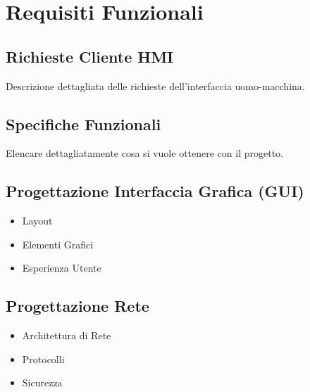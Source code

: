 \documentclass[a4paper,12pt]{article}
\begin{document}
\section{Requisiti Funzionali}
\subsection{Richieste Cliente HMI}
Descrizione dettagliata delle richieste dell'interfaccia uomo-macchina.

\subsection{Specifiche Funzionali}
Elencare dettagliatamente cosa si vuole ottenere con il progetto.

\subsection{Progettazione Interfaccia Grafica (GUI)}
\begin{itemize}
    \item Layout
    \item Elementi Grafici
    \item Esperienza Utente
\end{itemize}

\subsection{Progettazione Rete}
\begin{itemize}
    \item Architettura di Rete
    \item Protocolli
    \item Sicurezza
\end{itemize}
\end{document}
